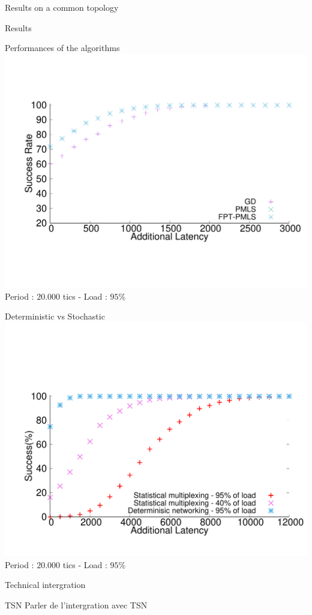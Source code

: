 \documentclass[10 pt]{beamer}
\begin{document}
\begin{section}{Results on a common topology}
\begin{subsection}{Results}

  \begin{frame}{Performances of the algorithms}
\centering
  \includegraphics[scale=0.4]{retour_21000.pdf}\\
  
    Period : $20.000$ tics -  Load : $95\%$
  \end{frame}
  
    \begin{frame}{Deterministic vs Stochastic}
\centering
\vspace{-2cm}
  \includegraphics[scale=0.4]{stochastic.pdf}\\
  
  Period : $20.000$ tics - Load : $95\%$
  \end{frame}
  
  

\end{subsection}


\end{section}


\begin{section}{Technical intergration}

  \begin{frame}{TSN}
Parler de l'intergration avec TSN
  

\end{frame}

\end{section}
\end{document}
